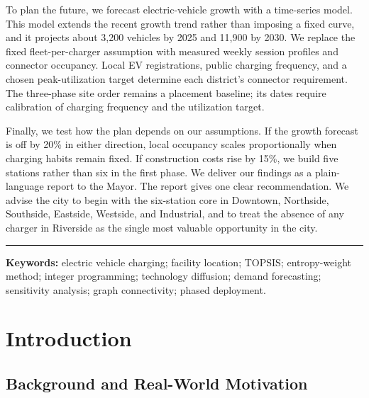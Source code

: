 \documentclass[12pt]{article}
\begin{document}
To plan the future, we forecast electric-vehicle growth with a time-series model. This
model extends the recent growth trend rather than imposing a fixed curve, and it projects
about 3,200 vehicles by 2025 and 11,900 by 2030. We replace the fixed fleet-per-charger
assumption with measured weekly session profiles and connector occupancy. Local EV
registrations, public charging frequency, and a chosen peak-utilization target determine
each district's connector requirement. The three-phase site order remains a placement
baseline; its dates require calibration of charging frequency and the utilization target.

Finally, we test how the plan depends on our assumptions. If the growth forecast is off by
20\% in either direction, local occupancy scales proportionally when charging habits
remain fixed. If construction costs rise by 15\%, we build five stations rather than six
in the first phase. We deliver our findings as a plain-language report to the Mayor. The
report gives one clear recommendation. We advise the city to begin with the six-station
core in Downtown, Northside, Southside, Eastside, Westside, and Industrial, and to treat
the absence of any charger in Riverside as the single most valuable opportunity in the
city.

\vspace{12pt}
\hrule
\vspace{2pt}
\noindent\textbf{Keywords:} electric vehicle charging; facility location; TOPSIS; entropy-weight method; integer programming; technology diffusion; demand forecasting; sensitivity analysis; graph connectivity; phased deployment.

\newpage

\tableofcontents
\newpage

\section{Introduction}

\subsection{Background and Real-World Motivation}
\end{document}
